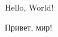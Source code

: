 \documentclass[14pt,a4paper,report]{ncc}
\begin{document}
Hello, World!

Привет, мир!
\end{document}
